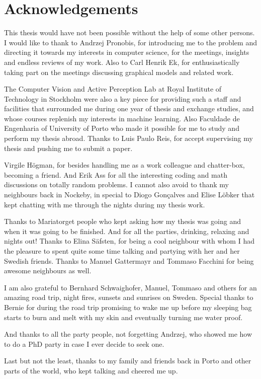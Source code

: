 \chapter*{Acknowledgements}
This thesis would have not been possible without the help of some other persons.
I would like to thank to Andrzej Pronobis, for introducing me to the problem and
directing it towards my interests in computer science, for the meetings, insights
and endless reviews of my work. Also to Carl Henrik Ek, for enthusiastically taking part
on the meetings discussing graphical models and related work.

The Computer Vision and Active Perception Lab at Royal Institute of Technology
in Stockholm were also a key piece for providing such a staff and facilities that
surrounded me during one year of thesis and exchange studies, and whose
courses replenish my interests in machine learning.
Also Faculdade de Engenharia of University of Porto who made it possible
for me to study and perform my thesis abroad.
Thanks to Luis Paulo Reis, for accept supervising my thesis and pushing me to submit a paper.

Virgile Högman, for besides handling me as a work colleague and chatter-box, becoming a friend.
And Erik Ass for all the interesting coding and math discussions on totally random problems.
I cannot also avoid to thank my neighbours back in Nockeby, in special to Diogo Gonçalves and Elise Löbker
that kept chatting with me through the nights during my thesis work.

Thanks to Mariatorget people who kept asking how my thesis was going and when it was going to be finished.
And for all the parties, drinking, relaxing and nights out! Thanks to Elina Säfsten, for being a cool neighbour
with whom I had the pleasure to spent quite some time talking and partying with her and her Swedish friends.
Thanks to Manuel Gattermayr and Tommaso Facchini for being awesome neighbours as well.

I am also grateful to Bernhard Schwaighofer, Manuel, Tommaso and others for an amazing
road trip, night fires, sunsets and sunrises on Sweden. Special thanks to Bernie for during the road trip
promising to wake me up before my sleeping bag starts to burn and melt with my skin and eventually turning me water proof.

And thanks to all the party people, not forgetting Andrzej, who showed me how to do a PhD party in case I ever decide
to seek one.

Last but not the least, thanks to my family and friends back in Porto and other parts of the world,
who kept talking and cheered me up.


\vspace{10mm}

